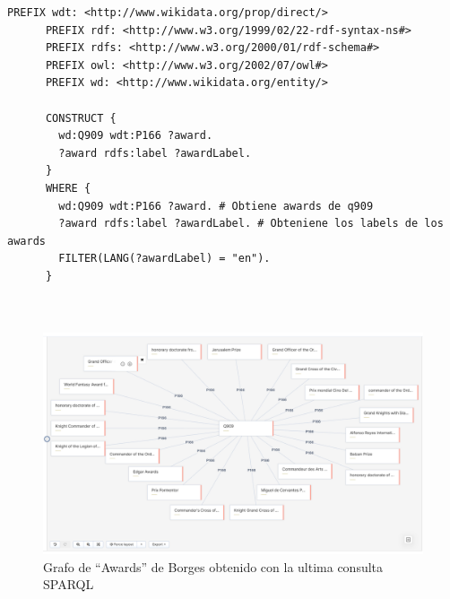   \begin{tcolorbox}[title=Usando CONSTRUCT\, crear un nuevo grafo con todos los premios recibidos por Borges (award received). Recuperando también los rdfs:label de esos premios y filtrarlos por idioma inglés (en).]

    \begin{lstlisting}[language=SPARQL, breaklines=true]
      PREFIX wdt: <http://www.wikidata.org/prop/direct/>
      PREFIX rdf: <http://www.w3.org/1999/02/22-rdf-syntax-ns#>
      PREFIX rdfs: <http://www.w3.org/2000/01/rdf-schema#>
      PREFIX owl: <http://www.w3.org/2002/07/owl#>
      PREFIX wd: <http://www.wikidata.org/entity/>

      CONSTRUCT {
        wd:Q909 wdt:P166 ?award.
        ?award rdfs:label ?awardLabel.
      }
      WHERE {
        wd:Q909 wdt:P166 ?award. # Obtiene awards de q909
        ?award rdfs:label ?awardLabel. # Obteniene los labels de los awards
        FILTER(LANG(?awardLabel) = "en").
      }
  
  
    \end{lstlisting}
    \end{tcolorbox}

    \begin{figure}[!h]
      \centering
      \includegraphics[width=16cm, scale=1]{Images/Imagenes/Grafo.png}
      \caption{Grafo de ``Awards'' de Borges obtenido con la ultima consulta SPARQL}
      \label{fig:marcado}
    \end{figure}